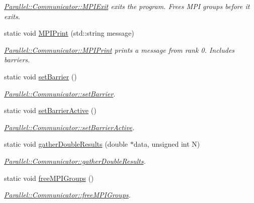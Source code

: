 \begin{DoxyCompactItemize}
\begin{DoxyCompactList}\small\item\em \mbox{\hyperlink{class_parallel_1_1_communicator_a57bb28ee8dbc4efd708a2695423778c4}{Parallel\+::\+Communicator\+::\+M\+P\+I\+Exit}} exits the program. Frees M\+PI groups before it exits. \end{DoxyCompactList}\item 
static void \mbox{\hyperlink{class_parallel_1_1_communicator_a34a1d27c0e2b2b101b97a53734dbc4f8}{M\+P\+I\+Print}} (std\+::string message)
\begin{DoxyCompactList}\small\item\em \mbox{\hyperlink{class_parallel_1_1_communicator_a34a1d27c0e2b2b101b97a53734dbc4f8}{Parallel\+::\+Communicator\+::\+M\+P\+I\+Print}} prints a message from rank 0. Includes barriers. \end{DoxyCompactList}\item 
static void \mbox{\hyperlink{class_parallel_1_1_communicator_a14aa3d54f5efe28094df886948e3dee2}{set\+Barrier}} ()
\begin{DoxyCompactList}\small\item\em \mbox{\hyperlink{class_parallel_1_1_communicator_a14aa3d54f5efe28094df886948e3dee2}{Parallel\+::\+Communicator\+::set\+Barrier}}. \end{DoxyCompactList}\item 
static void \mbox{\hyperlink{class_parallel_1_1_communicator_af61a4b8a49509982ae96d2a99dfb9f49}{set\+Barrier\+Active}} ()
\begin{DoxyCompactList}\small\item\em \mbox{\hyperlink{class_parallel_1_1_communicator_af61a4b8a49509982ae96d2a99dfb9f49}{Parallel\+::\+Communicator\+::set\+Barrier\+Active}}. \end{DoxyCompactList}\item 
static void \mbox{\hyperlink{class_parallel_1_1_communicator_ae5739683ff54a7c39af6e37920e70ea5}{gather\+Double\+Results}} (double $\ast$data, unsigned int N)
\begin{DoxyCompactList}\small\item\em \mbox{\hyperlink{class_parallel_1_1_communicator_ae5739683ff54a7c39af6e37920e70ea5}{Parallel\+::\+Communicator\+::gather\+Double\+Results}}. \end{DoxyCompactList}\item 
static void \mbox{\hyperlink{class_parallel_1_1_communicator_aca0ac979aee1a649dbe5d4582b06a707}{free\+M\+P\+I\+Groups}} ()
\begin{DoxyCompactList}\small\item\em \mbox{\hyperlink{class_parallel_1_1_communicator_aca0ac979aee1a649dbe5d4582b06a707}{Parallel\+::\+Communicator\+::free\+M\+P\+I\+Groups}}. \end{DoxyCompactList}\item 

\end{DoxyCompactItemize}
